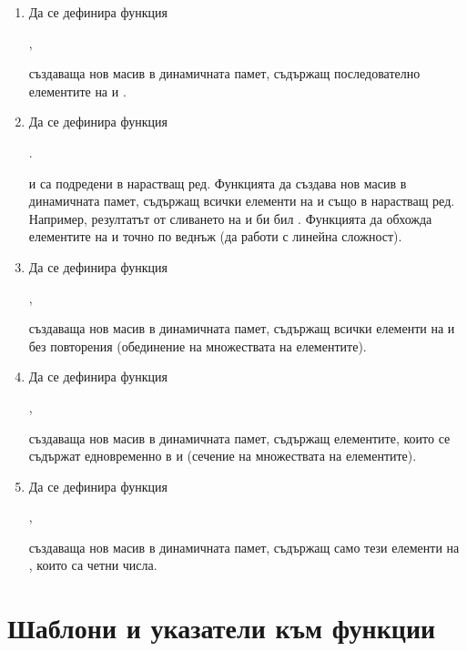 {\begin{enumerate}[resume]
  \item Да се дефинира функция 
  
        ,
       
        създаваща нов масив в динамичната памет, съдържащ последователно елементите на  и .

  \item Да се дефинира функция 

  .
  
   и  са подредени в нарастващ ред. Функцията да създава нов масив в динамичната памет, съдържащ всички елементи на  и  също в нарастващ ред. Например, резултатът от сливането на \code{[1,3,3,5]} и \code{[2,4,5]} би бил \code{[1,2,3,3,4,5,5]}. Функцията да обхожда елементите на  и  точно по веднъж (да работи с линейна сложност).

  \item Да се дефинира функция 
  
  ,
  
  създаваща нов масив в динамичната памет, съдържащ всички  елементи на  и  без повторения (обединение на множествата на елементите).

  \item Да се дефинира функция 
  
  ,
  
  създаваща нов масив в динамичната памет, съдържащ елементите, които се съдържат едновременно в  и  (сечение на множествата на елементите).

  \item Да се дефинира функция 
  
  ,
  
  създаваща нов масив в динамичната памет, съдържащ само тези елементи на , които са четни числа.

\end{enumerate}

\pagebreak


\clearpage\section {Шаблони и указатели към функции}

}
